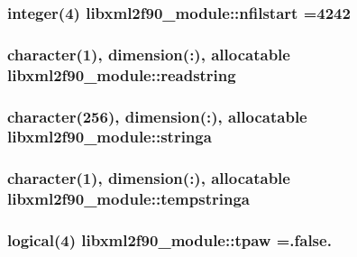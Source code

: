 \subsubsection[{\texorpdfstring{nfilstart}{nfilstart}}]{\setlength{\rightskip}{0pt plus 5cm}integer(4) libxml2f90\+\_\+module\+::nfilstart =4242}\hypertarget{namespacelibxml2f90__module_a76bbe7c27297a807f15421a654d7ca6b}{}\label{namespacelibxml2f90__module_a76bbe7c27297a807f15421a654d7ca6b}
\subsubsection[{\texorpdfstring{readstring}{readstring}}]{\setlength{\rightskip}{0pt plus 5cm}character(1), dimension(\+:), allocatable libxml2f90\+\_\+module\+::readstring}\hypertarget{namespacelibxml2f90__module_a791c6344181b9375ed7fc4470f4554aa}{}\label{namespacelibxml2f90__module_a791c6344181b9375ed7fc4470f4554aa}
\subsubsection[{\texorpdfstring{stringa}{stringa}}]{\setlength{\rightskip}{0pt plus 5cm}character(256), dimension(\+:), allocatable libxml2f90\+\_\+module\+::stringa}\hypertarget{namespacelibxml2f90__module_ab661dc207b668f91bdee9a3efea3dd49}{}\label{namespacelibxml2f90__module_ab661dc207b668f91bdee9a3efea3dd49}
\subsubsection[{\texorpdfstring{tempstringa}{tempstringa}}]{\setlength{\rightskip}{0pt plus 5cm}character(1), dimension(\+:), allocatable libxml2f90\+\_\+module\+::tempstringa}\hypertarget{namespacelibxml2f90__module_a55e059defbab12f54d54b8f44ad84777}{}\label{namespacelibxml2f90__module_a55e059defbab12f54d54b8f44ad84777}
\subsubsection[{\texorpdfstring{tpaw}{tpaw}}]{\setlength{\rightskip}{0pt plus 5cm}logical(4) libxml2f90\+\_\+module\+::tpaw =.false.}\hypertarget{namespacelibxml2f90__module_aaa46bc31e8406d83b035ff8b620563a8}{}\label{namespacelibxml2f90__module_aaa46bc31e8406d83b035ff8b620563a8}
